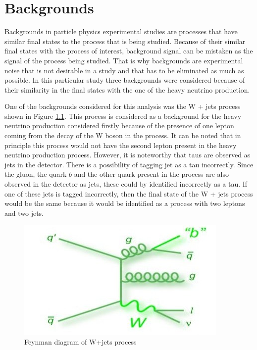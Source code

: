 \graphicspath{{Backgrounds/Figures/}}

\chapter{Backgrounds}

Backgrounds in particle physics experimental studies are processes that have similar final states to the process that is being studied. Because of their similar final states with the process of interest, background signal can be mistaken as the signal of the process being studied. That is why backgrounds are experimental noise that is not desirable in a study and that has to be eliminated as much as possible. In this particular study three backgrounds were considered because of their similarity in the final states with the one of the heavy neutrino production. 

One of the backgrounds considered for this analysis was the W + jets process shown in Figure \ref{fig: Wjets_background}. This process is considered as a background for the heavy neutrino production considered firstly because of the presence of one lepton coming from the decay of the W boson in the process. It can be noted that in principle this process would not have the second lepton present in the heavy neutrino production process. However, it is noteworthy that taus are observed as jets in the detector. There is a possibility of tagging  jet as a tau incorrectly. Since the gluon, the quark $b$ and the other quark present in the process are also observed in the detector as jets, these could by identified incorrectly as a tau. If one of these jets is tagged incorrectly, then the final state of the W + jets process would be the same because it would be identified as a process with two leptons and two jets. 

\begin{figure}[H]
\centering
\includegraphics[width = 0.7\linewidth]{Wjets}
\caption{Feynman diagram of W+jets process}
\label{fig: Wjets_background}
\end{figure}

